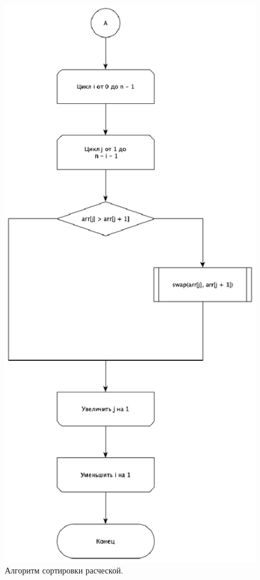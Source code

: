 \documentclass[12pt]{report}
\begin{document}
\begin{figure}[H]
\begin{minipage}[h!]{0.59\linewidth}
		\end{minipage}
		\begin{minipage}[h!]{0.39\linewidth}
			\includegraphics[width=1.5\linewidth]{Hairbrush2}
		\end{minipage}
		\caption{Алгоритм сортировки расческой.}
		\label{ris:image3}
	\end{figure}
\end{document}
